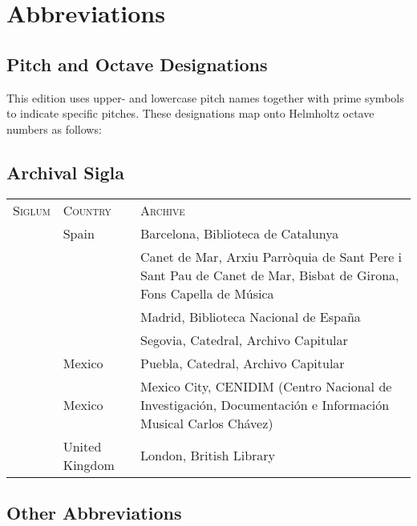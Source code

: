 \section{Abbreviations}

\subsection{Pitch and Octave Designations}

This edition uses upper- and lowercase pitch names together with prime symbols
to indicate specific pitches.
These designations map onto Helmholtz octave numbers as follows:



\subsection{Archival Sigla}

\begin{tabu} to \textwidth{llZ}
    \textsc{Siglum} & \textsc{Country} & \textsc{Archive}\\
     & Spain & Barcelona, Biblioteca de Catalunya\\
     &  & Canet de Mar, Arxiu Parròquia de Sant Pere i Sant Pau de Canet de 
    Mar, Bisbat de Girona, Fons Capella de Música\\
     & &  Madrid, Biblioteca Nacional de España\\
     & & Segovia, Catedral, Archivo Capitular\\
     & Mexico &  Puebla, Catedral, Archivo Capitular\\
     & Mexico & Mexico City, CENIDIM (Centro Nacional de Investigación, 
    Documentación e Información Musical Carlos Chávez)\\
     & United Kingdom & London, British Library\\
\end{tabu}

\subsection{Other Abbreviations}

